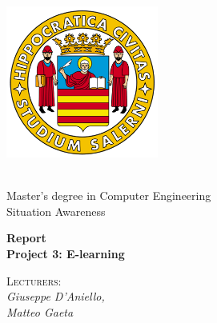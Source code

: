 \begin{titlepage}

    \begin{minipage}[b]{0.3\textwidth}
        \begin{flushleft}
            \includegraphics[width=5cm]{assets/unisa.png}
        \end{flushleft}
    \end{minipage}
    \hfill
    \begin{minipage}[b]{0.7\textwidth}
        \begin{flushright}
                \\ Master's degree in Computer Engineering
                \\ Situation Awareness 
        \end{flushright}
    \end{minipage}

    \hrulefill

    \vspace{1cm}

    \begin{Huge}
        \textbf{Report \\ Project 3: E-learning}
    \end{Huge}

    \begin{large}
         
    \end{large}

    \vspace{1.0cm}

    \begin{minipage}[t]{7cm}
        \flushleft
        \textsc{Lecturers:}\\
        \textit{Giuseppe D'Aniello,}\\ 
        \textit{Matteo Gaeta}\\
    \end{minipage}

    \vspace{0.5cm}
    

\end{titlepage}
